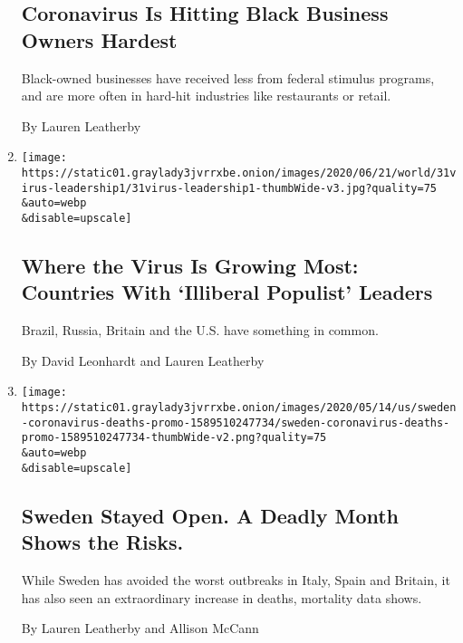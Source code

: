\begin{enumerate}
  \hypertarget{coronavirus-is-hitting-black-business-owners-hardest}{%
  \subsection{Coronavirus Is Hitting Black Business Owners
  Hardest}\label{coronavirus-is-hitting-black-business-owners-hardest}}

  Black-owned businesses have received less from federal stimulus
  programs, and are more often in hard-hit industries like restaurants
  or retail.

  By Lauren Leatherby
\item
  \href{/2020/06/02/briefing/coronavirus-populist-leaders.html}{}

  \texttt{[image: https://static01.graylady3jvrrxbe.onion/images/2020/06/21/world/31virus-leadership1/31virus-leadership1-thumbWide-v3.jpg?quality=75\\\&auto=webp\\\&disable=upscale]}

  \hypertarget{where-the-virus-is-growing-most-countries-with-illiberal-populist-leaders}{%
  \subsection{Where the Virus Is Growing Most: Countries With `Illiberal
  Populist'
  Leaders}\label{where-the-virus-is-growing-most-countries-with-illiberal-populist-leaders}}

  Brazil, Russia, Britain and the U.S. have something in common.

  By David Leonhardt and Lauren Leatherby
\item
  \href{/interactive/2020/05/15/world/europe/sweden-coronavirus-deaths.html}{}

  \texttt{[image: https://static01.graylady3jvrrxbe.onion/images/2020/05/14/us/sweden-coronavirus-deaths-promo-1589510247734/sweden-coronavirus-deaths-promo-1589510247734-thumbWide-v2.png?quality=75\\\&auto=webp\\\&disable=upscale]}

  \hypertarget{sweden-stayed-open-a-deadly-month-shows-the-risks}{%
  \subsection{Sweden Stayed Open. A Deadly Month Shows the
  Risks.}\label{sweden-stayed-open-a-deadly-month-shows-the-risks}}

  While Sweden has avoided the worst outbreaks in Italy, Spain and
  Britain, it has also seen an extraordinary increase in deaths,
  mortality data shows.

  By Lauren Leatherby and Allison McCann
\end{enumerate}

